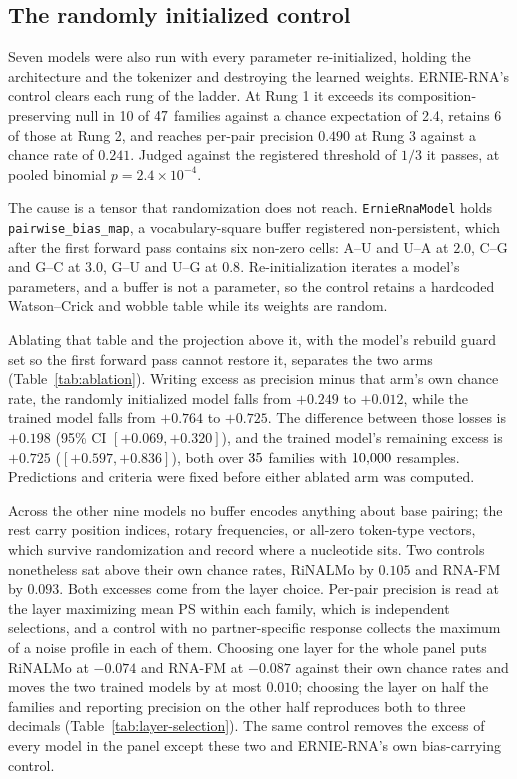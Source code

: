 \documentclass[11pt]{article}
\begin{document}
\subsection{The randomly initialized control}
\label{sec:random-init}

Seven models were also run with every parameter re-initialized, holding the
architecture and the tokenizer and destroying the learned weights. ERNIE-RNA's
control clears each rung of the ladder. At Rung 1 it exceeds its
composition-preserving null in 10 of $47{}$ families against a chance
expectation of 2.4, retains 6 of those at Rung 2, and reaches per-pair precision
$0.490$ at Rung 3 against a chance rate of $0.241$. Judged against the
registered threshold of $1/3$ it passes, at pooled binomial $p = 2.4 \times
10^{-4}$.

The cause is a tensor that randomization does not reach.
\texttt{ErnieRnaModel} holds \texttt{pairwise\_bias\_map}, a
vocabulary-square buffer registered non-persistent, which after the first
forward pass contains six non-zero cells: A--U and U--A at $2.0$, C--G and G--C
at $3.0$, G--U and U--G at $0.8$. Re-initialization iterates a model's
parameters, and a buffer is not a parameter, so the control retains a hardcoded
Watson--Crick and wobble table while its weights are random.



Ablating that table and the projection above it, with the model's rebuild guard
set so the first forward pass cannot restore it, separates the two arms
(Table~\ref{tab:ablation}). Writing excess as precision minus that arm's own
chance rate, the randomly initialized model falls from $+0.249$ to $+0.012$,
while the trained model falls from $+0.764$ to $+0.725$. The difference between
those losses is $+0.198$ (95\% CI $[+0.069, +0.320]$), and the trained model's
remaining excess is $+0.725$ ($[+0.597, +0.836]$), both over
$35{}$ families with $10{,}000{}$ resamples. Predictions and
criteria were fixed before either ablated arm was computed.

Across the other nine models no buffer encodes anything about base pairing;
the rest carry position indices, rotary frequencies, or all-zero token-type
vectors, which survive randomization and record where a nucleotide sits. Two
controls nonetheless sat above their own chance rates, RiNALMo by $0.105$ and
RNA-FM by $0.093$. Both excesses come from the layer choice. Per-pair precision
is read at the layer maximizing mean PS within each family, which is
\chanceRateN{} independent selections, and a control with no partner-specific
response collects the maximum of a noise profile in each of them. Choosing one
layer for the whole panel puts RiNALMo at $-0.074$ and RNA-FM at $-0.087$
against their own chance rates and moves the two trained models by at most
$0.010$; choosing the layer on half the families and reporting precision on the
other half reproduces both to three decimals
(Table~\ref{tab:layer-selection}). The same control removes the excess of every
model in the panel except these two and ERNIE-RNA's own bias-carrying control.
\end{document}
